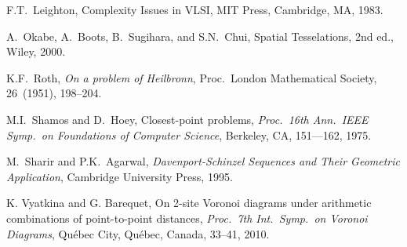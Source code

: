 \documentclass[10pt, conference, compsocconf]{IEEEtran}
\begin{document}
\begin{thebibliography}{99}
{\sc F.T.~Leighton},
Complexity Issues in VLSI,
MIT Press, Cambridge, MA, 1983.

{\sc A.~Okabe, A.~Boots, B.~Sugihara, and S.N.~Chui},
Spatial Tesselations, 2nd ed.,
Wiley, 2000.

{\sc K.F.~Roth},
{\em On a problem of Heilbronn},
Proc.\ London Mathematical Society,
26~(1951), 198--204.

{\sc M.I.~Shamos and D.~Hoey},
Closest-point problems,
\emph{Proc.\ 16th Ann.\ IEEE Symp.\ on Foundations of Computer Science},
Berkeley, CA,
151---162, 1975.

{\sc M.~Sharir and P.K.~Agarwal},
\emph{Davenport-Schinzel Sequences and Their Geometric Application},
Cambridge University Press, 1995.

{\sc K. Vyatkina and G. Barequet},
On 2-site Voronoi diagrams under arithmetic combinations of
point-to-point distances,
\emph{Proc.\ 7th Int.\ Symp.\ on Voronoi Diagrams},
Qu\'{e}bec City, Qu\'{e}bec, Canada, 33--41, 2010.

\end{thebibliography}
\end{document}
